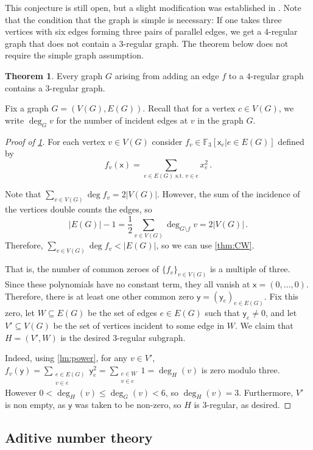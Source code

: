 \documentclass[12pt]{amsart}
\theoremstyle{definition}
\newtheorem{thm}{Theorem}[section]
\newcommand{\F}{\mathbb{F}}
\newcommand{\vx}{\mathsf{x}}
\newcommand{\vy}{\mathsf{y}}
\begin{document}
This conjecture is still open, but a slight modification was established in \cite{alon1984every}.
Note that the condition that the graph is simple is necessary: If one takes three vertices with six edges forming three pairs of parallel edges, we get a $4$-regular graph that does not contain a $3$-regular graph.
The theorem below does not require the simple graph assumption.

\begin{thm}\label{thm:3reggraphs}
Every graph $G$ arising from adding an edge $f$ to a $4$-regular graph contains a $3$-regular graph.
\end{thm}

Fix a graph $G = (V(G), E(G))$.
Recall that for a vertex $c\in V(G)$, we write $\deg_G v$ for the number of incident edges at $v$ in the graph $G$.

\begin{proof}[Proof of \cref{thm:3reggraphs}]
For each vertex $v\in V(G)$ consider $f_v \in \F_3[\vx_e | e\in E(G) ]$ defined by
$$f_v(\vx) = \sum_{e\in E(G) \text{ s.t. } v\in e} x_e^2 \, . $$

Note that $\sum_{v \in V(G)} \deg f_v = 2 |V(G)|$.
However, the sum of the incidence of the vertices double counts the edges, so
$$ |E(G)| - 1 = \frac{1}{2} \sum_{v \in V(G)} \deg_{G \setminus f} v = 2 |V(G)| \, . $$
Therefore, $\sum_{v \in V(G)} \deg f_v < |E(G)|$, so we can use \cref{thm:CW}.


That is, the number of common zeroes of $\{f_v\}_{v \in V(G)}$ is a multiple of three.
Since these polynomials have no constant term, they all vanish at $\vx = (0, \ldots, 0)$.
Therefore, there is at least one other common zero $\vy = (\vy_e)_{e \in E(G)}$.
Fix this zero, let $W \subseteq E(G)$ be the set of edges $e \in E(G)$ such that $\vy_e \neq 0$, and let $V' \subseteq V(G)$ be the set of vertices incident to some edge in $W$.
We claim that $H = (V', W)$ is the desired $3$-regular subgraph.

Indeed, using \cref{lm:power}, for any $v \in V'$, $f_v(\vy) = \sum_{\substack{e\in E(G) \\ v \in e}} \vy_e^2 = \sum_{\substack{e\in W \\ v \in e}} 1 = \deg_H(v)$ is zero modulo three.
However $0 < \deg_H(v) \leq \deg_G(v) < 6$, so $\deg_H (v) = 3$.
Furthermore, $V'$ is non empty, as $\vy $ was taken to be non-zero, so $H$ is $3$-regular, as desired.
\end{proof}

\subsection{Aditive number theory}
\end{document}
